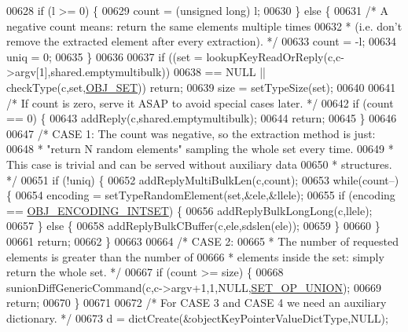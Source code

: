 \begin{DoxyCode}
00628     \textcolor{keywordflow}{if} (l >= 0) \{
00629         count = (\textcolor{keywordtype}{unsigned} \textcolor{keywordtype}{long}) l;
00630     \} \textcolor{keywordflow}{else} \{
00631         \textcolor{comment}{/* A negative count means: return the same elements multiple times}
00632 \textcolor{comment}{         * (i.e. don't remove the extracted element after every extraction). */}
00633         count = -l;
00634         uniq = 0;
00635     \}
00636 
00637     \textcolor{keywordflow}{if} ((set = lookupKeyReadOrReply(c,c->argv[1],shared.emptymultibulk))
00638         == NULL || checkType(c,set,\hyperlink{server_8h_a8d179375a4aac33d3fa7aa80c8ccc75f}{OBJ\_SET})) \textcolor{keywordflow}{return};
00639     size = setTypeSize(set);
00640 
00641     \textcolor{comment}{/* If count is zero, serve it ASAP to avoid special cases later. */}
00642     \textcolor{keywordflow}{if} (count == 0) \{
00643         addReply(c,shared.emptymultibulk);
00644         \textcolor{keywordflow}{return};
00645     \}
00646 
00647     \textcolor{comment}{/* CASE 1: The count was negative, so the extraction method is just:}
00648 \textcolor{comment}{     * "return N random elements" sampling the whole set every time.}
00649 \textcolor{comment}{     * This case is trivial and can be served without auxiliary data}
00650 \textcolor{comment}{     * structures. */}
00651     \textcolor{keywordflow}{if} (!uniq) \{
00652         addReplyMultiBulkLen(c,count);
00653         \textcolor{keywordflow}{while}(count--) \{
00654             encoding = setTypeRandomElement(set,&ele,&llele);
00655             \textcolor{keywordflow}{if} (encoding == \hyperlink{server_8h_a214173987de21c3b7661fddd42b05873}{OBJ\_ENCODING\_INTSET}) \{
00656                 addReplyBulkLongLong(c,llele);
00657             \} \textcolor{keywordflow}{else} \{
00658                 addReplyBulkCBuffer(c,ele,sdslen(ele));
00659             \}
00660         \}
00661         \textcolor{keywordflow}{return};
00662     \}
00663 
00664     \textcolor{comment}{/* CASE 2:}
00665 \textcolor{comment}{     * The number of requested elements is greater than the number of}
00666 \textcolor{comment}{     * elements inside the set: simply return the whole set. */}
00667     \textcolor{keywordflow}{if} (count >= size) \{
00668         sunionDiffGenericCommand(c,c->argv+1,1,NULL,\hyperlink{server_8h_af00a414b6d78bff8b325eb9cf82c3edb}{SET\_OP\_UNION});
00669         \textcolor{keywordflow}{return};
00670     \}
00671 
00672     \textcolor{comment}{/* For CASE 3 and CASE 4 we need an auxiliary dictionary. */}
00673     d = dictCreate(&objectKeyPointerValueDictType,NULL);

\end{DoxyCode}
